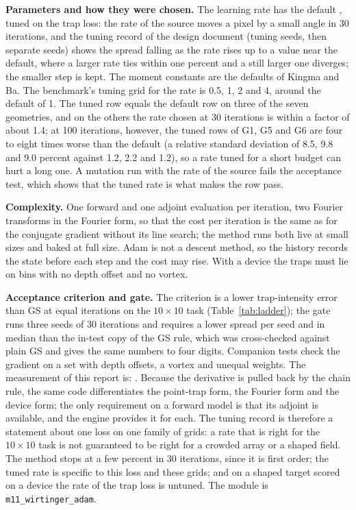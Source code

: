 \textbf{Parameters and how they were chosen.} The learning rate has the default , tuned on the trap loss: the rate of the source moves a pixel by a small angle in 30 iterations, and the tuning record of the design document (tuning seeds, then separate seeds) shows the spread falling as the rate rises up to a value near the default, where a larger rate ties within one percent and a still larger one diverges; the smaller step is kept. The moment constants are the defaults of Kingma and Ba. The benchmark's tuning grid for the rate is 0.5, 1, 2 and 4, around the default of 1. The tuned row equals the default row on three of the seven geometries, and on the others the rate chosen at 30 iterations is within a factor of about 1.4; at 100 iterations, however, the tuned rows of G1, G5 and G6 are four to eight times worse than the default (a relative standard deviation of 8.5, 9.8 and 9.0 percent against 1.2, 2.2 and 1.2), so a rate tuned for a short budget can hurt a long one. A mutation run with the rate of the source fails the acceptance test, which shows that the tuned rate is what makes the row pass.

\textbf{Complexity.} One forward and one adjoint evaluation per iteration, two Fourier transforms in the Fourier form, so that the cost per iteration is the same as for the conjugate gradient without its line search; the method runs both live at small sizes and baked at full size. Adam is not a descent method, so the history records the state before each step and the cost may rise. With a device the traps must lie on bins with no depth offset and no vortex.

\textbf{Acceptance criterion and gate.} The criterion is a lower trap-intensity error than GS at equal iterations on the $10\times10$ task (Table~\ref{tab:ladder}); the gate runs three seeds of 30 iterations and requires a lower spread per seed and in median than the in-test copy of the GS rule, which was cross-checked against plain GS and gives the same numbers to four digits. Companion tests check the gradient on a set with depth offsets, a vortex and unequal weights. The measurement of this report is: . Because the derivative is pulled back by the chain rule, the same code differentiates the point-trap form, the Fourier form and the device form; the only requirement on a forward model is that its adjoint is available, and the engine provides it for each. The tuning record is therefore a statement about one loss on one family of grids: a rate that is right for the $10\times10$ task is not guaranteed to be right for a crowded array or a shaped field. The method stops at a few percent in 30 iterations, since it is first order; the tuned rate is specific to this loss and these grids; and on a shaped target scored on a device the rate of the trap loss is untuned. The module is \texttt{m11\_wirtinger\_adam}.

